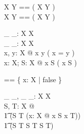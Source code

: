 \documentclass[11pt,a4paper]{article}
\begin{document}
%




\begin{zed}
	X \rel Y == \power ( X \cross Y ) \\
	X \fun Y == \power ( X \cross Y ) \\
\end{zed}


\begin{gendef}[X]
	\_ \neq \_: X \rel X \\
	\_ \notin \_: X \rel \power X \\
\where
	\forall x, y: X @ x \neq y \iff \lnot ( x = y ) \\
	\forall x: X; S: \power X @ x \notin S \iff \lnot ( x \in S )
\end{gendef}


\begin{zed}
\emptyset[X] == \{ x: X | false \}
\end{zed}

\begin{gendef}[X]
	\_ \subseteq \_, \_ \subset \_: \power X \rel \power X \\
\where
	\forall S, T: \power X @ \\
	\t1	(S \subseteq T \iff (\forall x: X @ x \in S \implies x \in T))
									\land \\
	\t1	(S \subset T \iff S \subseteq T \land S \neq T)
\end{gendef}
\end{document}

